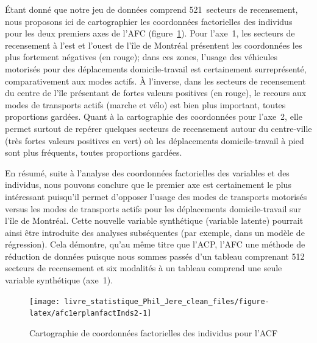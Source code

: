\documentclass[
  11pt,
  french,
]{book}
\begin{document}
Étant donné que notre jeu de données comprend 521~secteurs de recensement, nous proposons ici de cartographier les coordonnées factorielles des individus pour les deux premiers axes de l'AFC (figure~\ref{fig:afc1erplanfactInds2}). Pour l'axe~1, les secteurs de recensement à l'est et l'ouest de l'île de Montréal présentent les coordonnées les plus fortement négatives (en rouge); dans ces zones, l'usage des véhicules motorisés pour des déplacements domicile-travail est certainement surreprésenté, comparativement aux modes actifs. À l'inverse, dans les secteurs de recensement du centre de l'île présentant de fortes valeurs positives (en rouge), le recours aux modes de transports actifs (marche et vélo) est bien plus important, toutes proportions gardées. Quant à la cartographie des coordonnées pour l'axe~2, elle permet surtout de repérer quelques secteurs de recensement autour du centre-ville (très fortes valeurs positives en vert) où les déplacements domicile-travail à pied sont plus fréquents, toutes proportions gardées.

En résumé, suite à l'analyse des coordonnées factorielles des variables et des individus, nous pouvons conclure que le premier axe est certainement le plus intéressant puisqu'il permet d'opposer l'usage des modes de transports motorisés versus les modes de transports actifs pour les déplacements domicile-travail sur l'île de Montréal. Cette nouvelle variable synthétique (variable latente) pourrait ainsi être introduite des analyses subséquentes (par exemple, dans un modèle de régression). Cela démontre, qu'au même titre que l'ACP, l'AFC une méthode de réduction de données puisque nous sommes passés d'un tableau comprenant 512 secteurs de recensement et six modalités à un tableau comprend une seule variable synthétique (axe~1).

\begin{figure}

{\centering \texttt{[image: livre\_statistique\_Phil\_Jere\_clean\_files/figure-latex/afc1erplanfactInds2-1]} 

}

\caption{Cartographie de coordonnées factorielles des individus pour l'ACF}\label{fig:afc1erplanfactInds2}
\end{figure}
\end{document}
